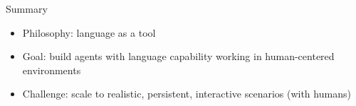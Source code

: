 \documentclass[usenames,dvipsnames,11pt,aspectratio=169]{beamer}
\begin{document}
\begin{frame}
    {Summary}
    \begin{itemize}
        \item Philosophy: language as a tool
        \item Goal: build agents with language capability working in human-centered environments
        \item Challenge: scale to realistic, persistent, interactive scenarios (with humans)
    \end{itemize}
\end{frame}
\end{document}
